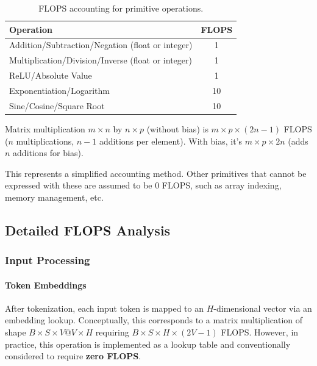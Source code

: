 \documentclass[11pt]{article}
\begin{document}
\begin{table}[h!]
    \centering
    \begin{tabular}{|l|c|}
        \hline
        \textbf{Operation} & \textbf{FLOPS} \\
        \hline
        Addition/Subtraction/Negation (float or integer) & 1 \\
        Multiplication/Division/Inverse (float or integer) & 1 \\
        ReLU/Absolute Value & 1 \\
        Exponentiation/Logarithm & 10 \\
        Sine/Cosine/Square Root & 10 \\
        \hline
    \end{tabular}
    \caption{FLOPS accounting for primitive operations.}
    \label{tab:flops_primitives}
\end{table}

Matrix multiplication \( m \times n \) by \( n \times p \) (without bias) is \( m \times p \times (2n - 1) \) FLOPS (\( n \) multiplications, \( n-1 \) additions per element). With bias, it’s \( m \times p \times 2n \) (adds \( n \) additions for bias).

This represents a simplified accounting method. Other primitives that cannot be expressed with these are assumed to be 0 FLOPS, such as array indexing, memory management, etc.



\subsection{Detailed FLOPS Analysis}



\subsubsection{Input Processing}

\paragraph{Token Embeddings}
After tokenization, each input token is mapped to an $H$-dimensional vector via an embedding lookup. Conceptually, this corresponds to a matrix multiplication of shape $B \times S \times V @ V \times H$ requiring $B \times S \times H \times (2V-1)$ FLOPS. However, in practice, this operation is implemented as a lookup table and conventionally considered to require \textbf{zero FLOPS}.
\end{document}
